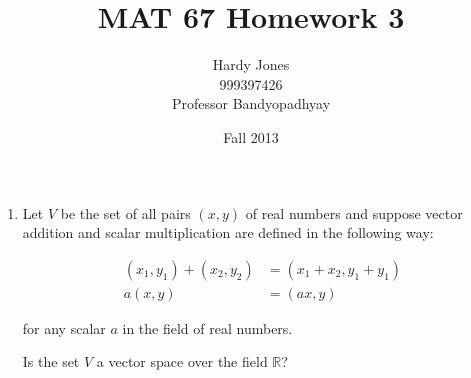 \documentclass[12pt,letterpaper]{article}
\title{MAT 67 Homework 3\vspace{-2ex}}
\author{Hardy Jones\\
        999397426\\
        Professor Bandyopadhyay\vspace{-2ex}}
\date{Fall 2013}
\begin{document}
  \maketitle

  \begin{enumerate}
    \item
      Let $V$ be the set of all pairs $(x,y)$ of real numbers and suppose vector addition and scalar multiplication are defined in the following way:

      \begin{align*}
        (x_1,y_1) + (x_2,y_2) &= (x_1 + x_2, y_1 + y_1) \\
        a(x,y) &= (ax,y)
      \end{align*}

      for any scalar $a$ in the field of real numbers.

      Is the set $V$ a vector space over the field $\mathbb{R}$?
  \end{enumerate}
\end{document}
